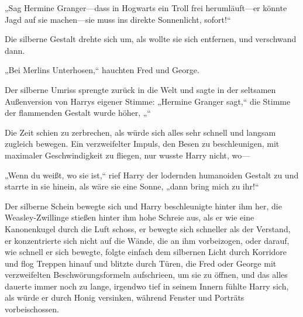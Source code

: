 „Sag Hermine Granger—dass in Hogwarts ein Troll frei herumläuft—er könnte Jagd auf sie machen—sie muss ins direkte Sonnenlicht, sofort!“

Die silberne Gestalt drehte sich um, als wollte sie sich entfernen, und verschwand dann.

„Bei Merlins Unterhosen,“ hauchten Fred und George.

Der silberne Umriss sprengte zurück in die Welt und sagte in der seltsamen Außenversion von Harrys eigener Stimme: „Hermine Granger sagt,“ die Stimme der flammenden Gestalt wurde höher, „“

Die Zeit schien zu zerbrechen, als würde sich alles sehr schnell und langsam zugleich bewegen. Ein verzweifelter Impuls, den Besen zu beschleunigen, mit maximaler Geschwindigkeit zu fliegen, nur wusste Harry nicht, wo—

„Wenn du weißt, wo sie ist,“ rief Harry der lodernden humanoiden Gestalt zu und starrte in sie hinein, als wäre sie eine Sonne, „dann bring mich zu ihr!“

Der silberne Schein bewegte sich und Harry beschleunigte hinter ihm her, die Weasley-Zwillinge stießen hinter ihm hohe Schreie aus, als er wie eine Kanonenkugel durch die Luft schoss, er bewegte sich schneller als der Verstand, er konzentrierte sich nicht auf die Wände, die an ihm vorbeizogen, oder darauf, wie schnell er sich bewegte, folgte einfach dem silbernen Licht durch Korridore und flog Treppen hinauf und blitzte durch Türen, die Fred oder George mit verzweifelten Beschwörungsformeln aufschrieen, um sie zu öffnen, und das alles dauerte immer noch zu lange, irgendwo tief in seinem Innern fühlte Harry sich, als würde er durch Honig versinken, während Fenster und Porträts vorbeischossen.

